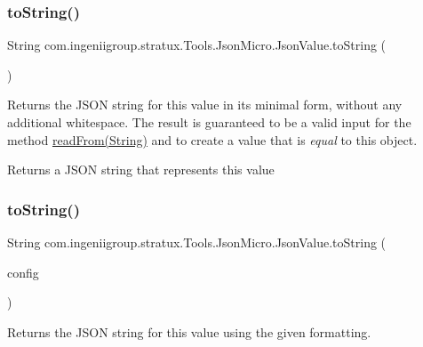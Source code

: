 \subsubsection{\texorpdfstring{to\+String()}{toString()}\hspace{0.1cm}{\footnotesize\ttfamily [1/2]}}
{\footnotesize\ttfamily String com.\+ingeniigroup.\+stratux.\+Tools.\+Json\+Micro.\+Json\+Value.\+to\+String (\begin{DoxyParamCaption}{ }\end{DoxyParamCaption})}

Returns the J\+S\+ON string for this value in its minimal form, without any additional whitespace. The result is guaranteed to be a valid input for the method \hyperlink{classcom_1_1ingeniigroup_1_1stratux_1_1_tools_1_1_json_micro_1_1_json_value_a2dd5b0d5a1d637df8aa1606fd17f9b84}{read\+From(\+String)} and to create a value that is {\itshape equal} to this object.

\begin{DoxyReturn}{Returns}
a J\+S\+ON string that represents this value 
\end{DoxyReturn}
\mbox{\label{classcom_1_1ingeniigroup_1_1stratux_1_1_tools_1_1_json_micro_1_1_json_value_af2572445c4b1f430355ba41be454754b}} 
\subsubsection{\texorpdfstring{to\+String()}{toString()}\hspace{0.1cm}{\footnotesize\ttfamily [2/2]}}
{\footnotesize\ttfamily String com.\+ingeniigroup.\+stratux.\+Tools.\+Json\+Micro.\+Json\+Value.\+to\+String (\begin{DoxyParamCaption}\item[{\hyperlink{classcom_1_1ingeniigroup_1_1stratux_1_1_tools_1_1_json_micro_1_1_writer_config}{Writer\+Config}}]{config }\end{DoxyParamCaption})}

Returns the J\+S\+ON string for this value using the given formatting.


